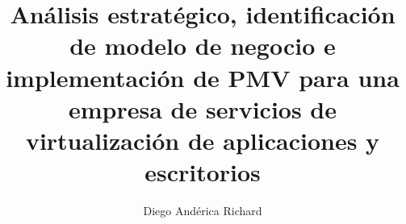 \title{Análisis estratégico, identificación de modelo de negocio e implementación de \acf{PMV} para una empresa de servicios de virtualización de aplicaciones y escritorios}
\author{Diego Andérica Richard}{}




\phone{}





